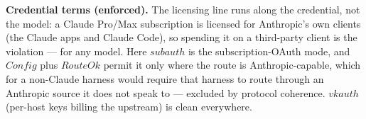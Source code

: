\documentclass{article}
\begin{document}
\textbf{Credential terms (enforced).} The licensing line runs along the
credential, not the model: a Claude Pro/Max subscription is licensed for
Anthropic's own clients (the Claude apps and Claude Code), so spending it on a
third-party client is the violation --- for any model. Here $subauth$ is the
subscription-OAuth mode, and $Config$ plus $RouteOk$ permit it only where the
route is Anthropic-capable, which for a non-Claude harness would require that
harness to route through an Anthropic source it does not speak to --- excluded by
protocol coherence. $vkauth$ (per-host keys billing the upstream) is clean
everywhere.
\end{document}
